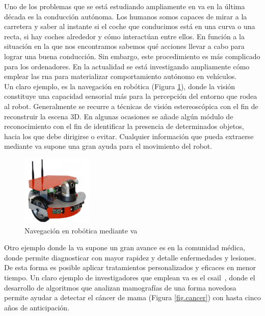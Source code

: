 Uno de los problemas que se está estudiando ampliamente en \acrshort{va} en la última década es la conducción autónoma. Los humanos somos capaces de mirar a la carretera y saber al instante si el coche que conducimos está en una curva o una recta, si hay coches alrededor y cómo interactúan entre ellos. En función a la situación en la que nos encontramos sabemos qué acciones llevar a cabo para lograr una buena conducción.  Sin embargo, este procedimiento es más complicado para los ordenadores. En la actualidad se está investigando ampliamente cómo emplear las \acrfull{rna} para materializar comportamiento autónomo en vehículos.\\

Un claro ejemplo, es la navegación en robótica (Figura \ref{fig.robot}), donde la visión constituye una capacidad sensorial más para la percepción del entorno que rodea al robot. Generalmente se recurre a técnicas de visión estereoscópica con el fin de reconstruir la escena 3D. En algunas ocasiones se añade algún módulo de reconocimiento con el fin de identificar la presencia de determinados objetos, hacia los que debe dirigirse o evitar. Cualquier información que pueda extraerse mediante \acrshort{va} supone una gran ayuda para el movimiento del robot. \\

\begin{figure}[H]
  \begin{center}
    \includegraphics[width=0.3\textwidth]{figures/introduccion/robot.jpg}
		\caption{Navegación en robótica mediante \acrshort{va}}
		\label{fig.robot}
		\end{center}
\end{figure}


Otro ejemplo donde la \acrshort{va} supone un gran avance es en la comunidad médica, donde permite diagnosticar con mayor rapidez y detalle enfermedades y lesiones. De esta forma es posible aplicar tratamientos personalizados y eficaces en menor tiempo. Un claro ejemplo de investigadores que emplean \acrshort{va} es el \acrfull{csail}~\cite{cancer}, donde el desarrollo de algoritmos que analizan mamografías de una forma novedosa permite ayudar a detectar el cáncer de mama (Figura \ref{fig.cancer}) con hasta cinco años de anticipación.\\

